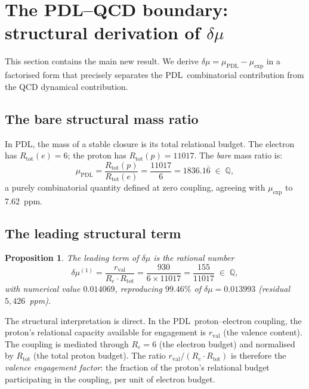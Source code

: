 \documentclass[11pt,a4paper]{article}
\newtheorem{proposition}[theorem]{Proposition}
\theoremstyle{definition}
\newcommand{\PDL}{\textnormal{PDL}}
\newcommand{\Rtot}{R_{\mathrm{tot}}}
\newcommand{\rval}{r_{\mathrm{val}}}
\newcommand{\muPDL}{\mu_{\mathrm{PDL}}}
\newcommand{\muexp}{\mu_{\mathrm{exp}}}
\newcommand{\dmu}{\delta\mu}
\begin{document}
\section{The PDL--QCD boundary: structural derivation of \texorpdfstring{$\dmu$}{delta-mu}}
\label{sec:boundary}

This section contains the main new result. We derive $\dmu = \muPDL - \muexp$ in a factorised form that precisely separates the \PDL\ combinatorial contribution from the QCD dynamical contribution.

\subsection{The bare structural mass ratio}
\label{subsec:bare}

In \PDL, the mass of a stable closure is its total relational budget. The electron has $\Rtot(e) = 6$; the proton has $\Rtot(p) = 11017$. The \emph{bare} mass ratio is:
\begin{equation}
\label{eq:mu_bare}
\muPDL = \frac{\Rtot(p)}{\Rtot(e)} = \frac{11017}{6} = 1836.1\overline{6} \;\in\; \mathbb{Q},
\end{equation}
a purely combinatorial quantity defined at zero coupling, agreeing with $\muexp$ to 7.62~ppm.

\subsection{The leading structural term}
\label{subsec:leading}

\begin{proposition}
\label{prop:leading_term}
The leading term of $\dmu$ is the rational number
\begin{equation}
\label{eq:dmu_leading}
\dmu^{(1)} = \frac{\rval}{R_e\cdot\Rtot} = \frac{930}{6\times 11017} = \frac{155}{11017} \;\in\; \mathbb{Q},
\end{equation}
with numerical value $0.014069$, reproducing $99.46\%$ of $\dmu = 0.013993$ (residual $5{,}426$~ppm).
\end{proposition}

The structural interpretation is direct. In the \PDL\ proton--electron coupling, the proton's relational capacity available for engagement is $\rval$ (the valence content). The coupling is mediated through $R_e = 6$ (the electron budget) and normalised by $\Rtot$ (the total proton budget). The ratio $\rval/(R_e\cdot\Rtot)$ is therefore the \emph{valence engagement factor}: the fraction of the proton's relational budget participating in the coupling, per unit of electron budget.
\end{document}
